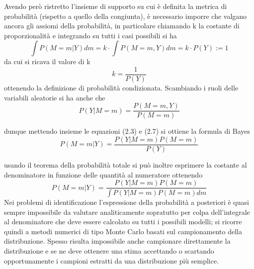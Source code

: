 \documentclass[10pt,a4paper,oneside,openany,noindent]{book}
\begin{document}
Avendo però ristretto l’insieme di supporto su cui è definita la metrica di probabilità (rispetto a quello della congiunta),
è necessario imporre che valgano ancora gli assiomi della probabilità, in particolare
chiamando k la costante di proporzionalità e integrando su tutti i casi possibili si ha
\begin{equation}\int P (M = m|Y )dm =
k \cdot \int P (M = m, Y )dm = k \cdot P (Y ) := 1\end{equation}
da cui si ricava il valore di k
\begin{equation}
k =\frac{1}{P(Y)}
\end{equation}
ottenendo la definizione di probabilità condizionata.
Scambiando i ruoli delle variabili aleatorie si ha anche che
\begin{equation}
P (Y |M = m) =\frac{
P (M = m, Y )}{
P (M = m)}
\end{equation}


dunque mettendo insieme le equazioni (2.3) e (2.7) si ottiene la formula di Bayes
\begin{equation}
P (M = m|Y ) =\frac{
P (Y |M = m)P (M = m)}{
P (Y )}
\end{equation}

usando il teorema della probabilità totale si può inoltre esprimere la costante al
denominatore in funzione delle quantità al numeratore ottenendo
\begin{equation}
P (M = m|Y ) =\frac{
P (Y |M = m)P (M = m)}{\int
P (Y |M = m)P (M = m)dm}
\end{equation}
Nei problemi di identificazione l’espressione della probabilità a posteriori è quasi
sempre impossibile da valutare analiticamente sopratutto per colpa dell’integrale al
denominatore che deve essere calcolato su tutti i possibili modelli; si ricorre quindi a
metodi numerici di tipo Monte Carlo basati sul campionamento della distribuzione.
Spesso risulta impossibile anche campionare direttamente la distribuzione e se ne
deve ottenere una stima accettando o scartando opportunamente i campioni estratti
da una distribuzione più semplice.
\end{document}
